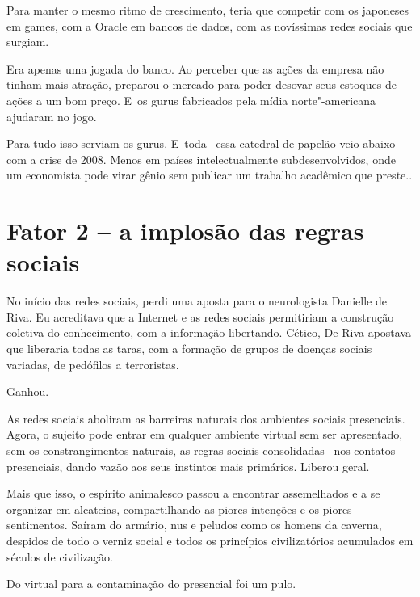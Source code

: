 Para manter o mesmo ritmo de crescimento, teria que competir com os
japoneses em games, com a Oracle em bancos de dados, com as novíssimas
redes sociais que surgiam.

 

Era apenas uma jogada do banco. Ao perceber que as ações da empresa não
tinham mais atração, preparou o mercado para poder desovar seus estoques
de ações a um bom preço. E~os gurus fabricados pela mídia
norte"-americana ajudaram no jogo.

 

Para tudo isso serviam os gurus. E~toda ~essa catedral de papelão veio
abaixo com a crise de 2008. Menos em países intelectualmente
subdesenvolvidos, onde um economista pode virar gênio sem publicar um
trabalho acadêmico que preste..

 

\section{Fator 2 -- a implosão das regras sociais}

 

No início das redes sociais, perdi uma aposta para o neurologista
Danielle de Riva. Eu acreditava que a Internet e as redes sociais
permitiriam a construção coletiva do conhecimento, com a informação
libertando. Cético, De Riva apostava que liberaria todas as taras, com a
formação de grupos de doenças sociais variadas, de pedófilos a
terroristas.

 

Ganhou.

 

As redes sociais aboliram as barreiras naturais dos ambientes sociais
presenciais. Agora, o sujeito pode entrar em qualquer ambiente virtual
sem ser apresentado, sem os constrangimentos naturais, as regras sociais
consolidadas ~nos contatos presenciais, dando vazão aos seus instintos
mais primários. Liberou geral.

 

Mais que isso, o espírito animalesco passou a encontrar assemelhados e a
se organizar em alcateias, compartilhando as piores intenções e os
piores sentimentos. Saíram do armário, nus e peludos como os homens da
caverna, despidos de todo o verniz social e todos os princípios
civilizatórios acumulados em séculos de civilização.

Do virtual para a contaminação do presencial foi um pulo.

 

